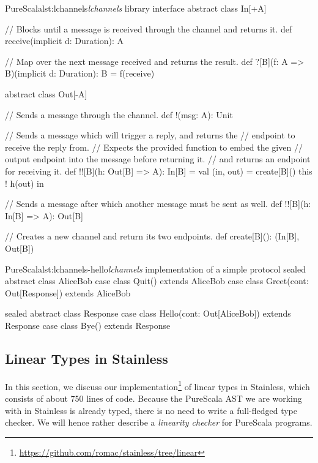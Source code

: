 \documentclass[a4paper,twoside]{article}
\newcommand{\stt}[1]{\texttt{\small{#1}}}
\begin{document}
\begin{Code}{PureScala}{lst:lchannels}{\textit{lchannels} library interface}
abstract class In[+A] {
  // Blocks until a message is received through the channel and returns it.
  def receive(implicit d: Duration): A
  
  // Map over the next message received and returns the result.
  def ?[B](f: A => B)(implicit d: Duration): B = {
    f(receive)
  }
}

abstract class Out[-A] {
  // Sends a message through the channel.
  def !(msg: A): Unit

  // Sends a message which will trigger a reply, and returns the
  // endpoint to receive the reply from.
  // Expects the provided function to embed the given
  // output endpoint into the message before returning it.
  // and returns an endpoint for receiving it.
  def !![B](h: Out[B] => A): In[B] = {
    val (in, out) = create[B]()
    this ! h(out)
    in
  }
  
  // Sends a message after which another message must be sent as well.
  def !![B](h: In[B] => A): Out[B]

  // Creates a new channel and return its two endpoints.
  def create[B](): (In[B], Out[B])
}
\end{Code}

\begin{Code}{PureScala}{lst:lchannels-hello}{\textit{lchannels} implementation of a simple protocol}
sealed abstract class AliceBob
case class Quit()                     extends AliceBob
case class Greet(cont: Out[Response]) extends AliceBob

sealed abstract class Response
case class Hello(cont: Out[AliceBob]) extends Response
case class Bye()                      extends Response
\end{Code}

\subsection{Linear Types in Stainless}

\newcommand{\lin}[1]{\stt{Linear[#1]}}

In this section, we discuss our implementation\footnote{\url{https://github.com/romac/stainless/tree/linear}} of linear types in Stainless, which consists of about 750 lines of code. Because the PureScala AST we are working with in Stainless is already typed, there is no need to write a full-fledged type checker. We will hence rather describe a \textit{linearity checker} for PureScala programs.
\end{document}
